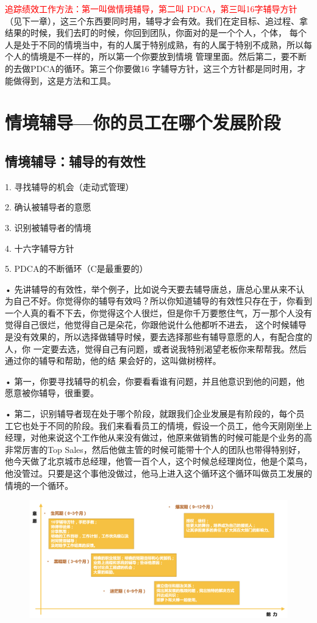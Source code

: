 \documentclass[12pt]{article}
\begin{document}
\textcolor{red}{追踪绩效工作方法：第一叫做情境辅导，第二叫 PDCA，第三叫16字辅导方针}（见下一章），这三个东西要同时用，辅导才会有效。我们在定目标、追过程、拿结果的时候，我们去盯的时候，你回到团队，你面对的是一个个人，个体， 每个人是处于不同的情境当中，有的人属于特别成熟，有的人属于特别不成熟，所以每个人的情境是不一样的，所以第一个你要放到情境 管理里面。然后第二，要不断的去做PDCA的循环。第三个你要做16 字辅导方针，这三个方针都是同时用，才能做得到，这是方法和工具。

\section{情境辅导—你的员工在哪个发展阶段}
\subsection{情境辅导：辅导的有效性}
1. 寻找辅导的机会（走动式管理）

2. 确认被辅导者的意愿

3. 识别被辅导者的情境

4. 十六字辅导方针

5. PDCA的不断循环（C是最重要的）

• 先讲辅导的有效性，举个例子，比如说今天要去辅导唐总，唐总心里从来不认为自己不好。你觉得你的辅导有效吗？所以你知道辅导的有效性只存在于，你看到一个人真的看不下去，你觉得这个人很烂，但是你千万要憋住气，万一那个人没有觉得自己很烂，他觉得自己是朵花，你跟他说什么他都听不进去， 这个时候辅导是没有效果的，所以选择做辅导时候，要去选择那些有辅导意愿的人，有配合度的人，你 一定要去选，觉得自己有问题，或者说我特别渴望老板你来帮帮我。然后通过你的辅导和帮助，他的结 果会好的，这叫做树榜样。

• 第一，你要寻找辅导的机会，你要看看谁有问题，并且他意识到他的问题，他愿意被你辅导，很重要。

• 第二，识别辅导者现在处于哪个阶段，就跟我们企业发展是有阶段的，每个员工它也处于不同的阶段。我们来看看员工的情境，假设一个员工，他今天刚刚坐上经理，对他来说这个工作他从来没有做过，他原来做销售的时候可能是个业务的高非常厉害的Top Sales，然后他做主管的时候可能带十个人的团队也带得特别好，他今天做了北京城市总经理，他管一百个人，这个时候总经理岗位，他是个菜鸟，他没管过。只要是这个事他没做过，他马上进入这个循环这个循环叫做员工发展的情境的一个循环。
\begin{figure}[H]
    \centering
    \includegraphics[width=1\textwidth]{fig/Ali_Performance_7.png}
\end{figure}
\end{document}
